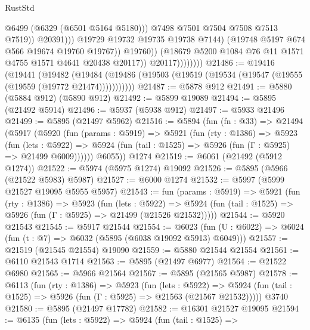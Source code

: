 \begin{lexlean}{RustStd}
\begin{coremodule}
{{                                          @6499
                                          (@6329 (@6501 @5164 @5180)))
                                        @7498
                                        @7501
                                        @7504
                                        @7508
                                        @7513
                                        @7519))
                                    @20391)))
                              @19729
                              @19732
                              @19735
                              @19738
                              @7144)
                            (@19748 @5197 @674 @566 @19674 @19760 @19767))
                          @19760))
                      (@18679 @5200 @1084 @76 @11 @1571 @4755 @1571 @4641 @20438 @20117))
                    @20117))))))))
@21486 := @19416
    (@19441
      (@19482
        (@19484 (@19486 (@19503 (@19519 (@19534 (@19547 (@19555 (@19559 (@19772 @21474)))))))))))
@21487 := @5878 @912
@21491 := @5880 (@5884 @912) (@5890 @912)
@21492 := @5899 @19089
@21494 := @5895 (@21492 @5914)
@21496 := @5937 (@5938 @912)
@21497 := @5933 @21496
@21499 := @5895 (@21497 @5962)
@21516 := @5894
    (fun (fn : @33) =>
    @21494
      (@5917
        (@5920
          (fun (params : @5919) =>
          @5921
            (fun (rty : @1386) =>
            @5923
              (fun (lets : @5922) =>
              @5924 (fun (tail : @1525) => @5926 (fun (Γ : @5925) => @21499 @6009))))))
        @6055))
    @1274
@21519 := @6061 (@21492 (@5912 @1274))
@21522 := @5974 (@5975 @1274) @19092
@21526 := @5895 (@5966 (@21522 @5983) @5987)
@21527 := @6000 @1274
@21532 := @5997 (@5999 @21527 @19095 @5955 @5957)
@21543 := fun (params : @5919) =>
  @5921
    (fun (rty : @1386) =>
    @5923
      (fun (lets : @5922) =>
      @5924 (fun (tail : @1525) => @5926 (fun (Γ : @5925) => @21499 (@21526 @21532)))))
@21544 := @5920 @21543
@21545 := @5917 @21544
@21554 := @6023
    (fun (U : @6022) => @6024 (fun (t : @7) => @6032 (@5895 (@6038 @19092 @5913) @6049)))
@21557 := @21519 (@21545 @21554) @19090
@21559 := @5880 @21544 @21554
@21561 := @6110 @21543 @1714
@21563 := @5895 (@21497 @6977)
@21564 := @21522 @6980
@21565 := @5966 @21564
@21567 := @5895 (@21565 @5987)
@21578 := @6113
    (fun (rty : @1386) =>
    @5923
      (fun (lets : @5922) =>
      @5924 (fun (tail : @1525) => @5926 (fun (Γ : @5925) => @21563 (@21567 @21532)))))
    @3740
@21580 := @5895 (@21497 @17782)
@21582 := @16301 @21527 @19095
@21594 := @6135
    (fun (lets : @5922) =>
    @5924
      (fun (tail : @1525) =>
}}
\end{coremodule}
\end{lexlean}
